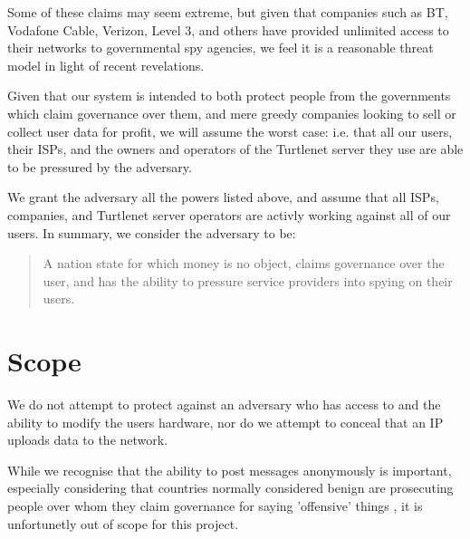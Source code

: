 Some of these claims may seem extreme, but given that companies such as BT,
Vodafone Cable, Verizon, Level 3, and others have provided unlimited access to
their networks\cite{tempora} to governmental spy agencies, we feel it is a
reasonable threat model in light of recent revelations\cite{wikiDisclosures}.

Given that our system is intended to both protect people from the governments
which claim governance over them, and mere greedy companies looking to sell or
collect user data for profit, we will assume the worst case: i.e. that all
our users, their ISPs, and the owners and operators of the Turtlenet server they
use are able to be pressured by the adversary.

We grant the adversary all the powers listed above, and assume that
all ISPs, companies, and Turtlenet server operators are activly working against
all of our users. In summary, we consider the adversary to be:

\begin{quote}
\centering
A nation state for which money is no object, claims governance over the user,
and has the ability to pressure service providers into spying on their users.
\end{quote}

\section{Scope}
We do not attempt to protect against an adversary who has access to and the
ability to modify the users hardware, nor do we attempt to conceal that an IP
uploads data to the network.

While we recognise that the ability to post messages anonymously is important,
especially considering that countries normally considered benign are prosecuting
people over whom they claim governance for saying 'offensive' things
\cite{illegalOpinions}, it is unfortunetly out of scope for this project.
